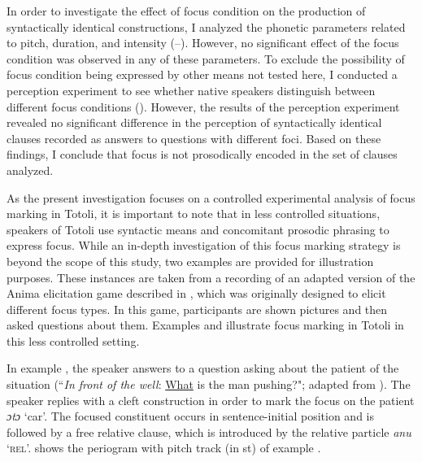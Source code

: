 In order to investigate the effect of focus condition on the production of syntactically identical constructions, I analyzed the phonetic parameters related to pitch, duration, and intensity (--). However, no significant effect of the focus condition was observed in any of these parameters.  To exclude the possibility of focus condition  being expressed by other means not tested here, I conducted a perception experiment to see whether native speakers distinguish between different focus conditions (). However, the results of the perception experiment revealed no significant difference in the perception of syntactically identical clauses recorded as answers to questions with different foci. Based on these findings, I conclude that focus is not prosodically encoded in the set of clauses analyzed.



As the present investigation focuses on a controlled experimental analysis of focus marking in Totoli, it is important to note that in less controlled situations, speakers of Totoli use syntactic means and concomitant prosodic phrasing to express focus. While an in-depth investigation of this focus marking strategy is beyond the scope of this study, two examples are provided for illustration purposes. These instances are taken from a recording of an adapted version of the Anima elicitation game described in \citet[99--107]{Skopeteas.2006b}, which was originally designed to elicit different focus types. In this game, participants are shown pictures and then asked questions about them. Examples  and   illustrate focus marking in Totoli in this less controlled setting.



In example , the speaker answers to a question asking about the patient of the situation (``\textit{In front of the well}: \underline{What} is the man pushing?";  adapted from \citealt[103]{Skopeteas.2006b}). 
The speaker replies with a cleft construction in order to mark the focus on the patient \textit{ɔtɔ} `car'. The focused constituent occurs in sentence-initial position and is followed by a free relative clause, which is introduced by the relative particle \textit{anu} `\textsc{rel}'. 	  shows the periogram with pitch track (in st) of example 	.



